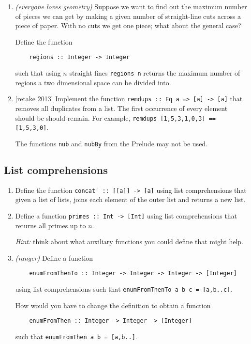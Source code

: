 \documentclass{article}
\def\code#1{\texttt{#1}}
\begin{document}
\begin{enumerate}
\item \cite[p. 85]{thompson} \textit{(everyone loves geometry)} Suppose we want to find out the maximum number of pieces we can get by making a given number of straight-line cuts across a piece of paper. With no cuts we get one piece; what about the general case? \par
Define the function
\begin{verbatim}
    regions :: Integer -> Integer
\end{verbatim}
such that using $n$ straight lines \verb|regions n| returns the maximum number of regions a two dimensional space can be divided into.

\item {[retake 2013]} Implement the function \code{remdups :: Eq a => [a] -> [a]} that removes all duplicates from a list. The first occurrence of every element should be should remain. For example, \code{remdups [1,5,3,1,0,3] == [1,5,3,0]}. \par
The functions \code{nub} and \code{nubBy} from the Prelude may not be used.
\end{enumerate}

\subsection{List comprehensions}
\begin{enumerate}
\item Define the function \verb|concat' :: [[a]] -> [a]| using list comprehensions that given a list of lists, joins each element of the outer list and returns a new list.

\item Define a function \verb|primes :: Int -> [Int]| using list comprehensions that returns all primes up to $n$. \par
\textit{Hint:} think about what auxiliary functions you could define that might help.

\item \textit{(ranger)} Define a function
\begin{verbatim}
    enumFromThenTo :: Integer -> Integer -> Integer -> [Integer]
\end{verbatim}
using list comprehensions such that \verb|enumFromThenTo a b c = [a,b..c]|. \par
How would you have to change the definition to obtain a function
\begin{verbatim}
    enumFromThen :: Integer -> Integer -> [Integer]
\end{verbatim}
such that \verb|enumFromThen a b = [a,b..]|.
\end{enumerate}
\end{document}
